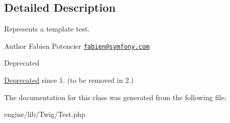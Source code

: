 \subsection{Detailed Description}
Represents a template test.

\begin{DoxyAuthor}{Author}
Fabien Potencier \href{mailto:fabien@symfony.com}{\tt fabien@symfony.\+com} 
\end{DoxyAuthor}
\begin{DoxyRefDesc}{Deprecated}
\item[\hyperlink{deprecated__deprecated000024}{Deprecated}]since 1. (to be removed in 2.) \end{DoxyRefDesc}


The documentation for this class was generated from the following file\+:\begin{DoxyCompactItemize}
\item 
engine/lib/\+Twig/Test.\+php\end{DoxyCompactItemize}
